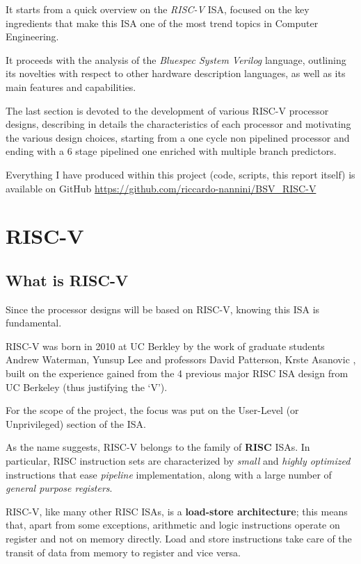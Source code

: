 \documentclass[12pt,oneside,a4paper]{article}
\begin{document}
It starts from a quick overview on the \textit{RISC-V} ISA, focused on the key ingredients that make this ISA one of the most trend topics in Computer Engineering.

It proceeds with the analysis of the \textit{Bluespec System Verilog} language, outlining its novelties with respect to other hardware description languages, as well as its main features and capabilities. 

The last section is devoted to the development of various RISC-V processor designs, describing in details the characteristics of each processor and motivating the various design choices, starting from a one cycle non pipelined processor and ending with a 6 stage pipelined one enriched with multiple branch predictors.

Everything I have produced within this project (code, scripts, this report itself) is available on GitHub \url{https://github.com/riccardo-nannini/BSV_RISC-V}


\section{RISC-V} \label{sec:risc-v}
\subsection{What is RISC-V}
Since the processor designs will be based on RISC-V, knowing this ISA is fundamental.

RISC-V was born in 2010 at UC Berkley by the work of graduate students Andrew Waterman, Yunsup Lee and professors David Patterson, Krste Asanovic \cite{risc-v_original}, built on the experience gained from the 4 previous major RISC ISA design from UC Berkeley (thus justifying the ‘V’).

For the scope of the project, the focus was put on the User-Level (or Unprivileged) section of the ISA.

As the name suggests, RISC-V belongs to the family of \textbf{RISC} ISAs. In particular, RISC instruction sets are characterized by \textit{small} and \textit{highly optimized} instructions that ease \textit{pipeline} implementation, along with a large number of \textit{general purpose registers}. 

RISC-V, like many other RISC ISAs, is a \textbf{load-store architecture}; this means that, apart from some exceptions, arithmetic and logic instructions operate on register and not on memory directly. Load and store instructions take care of the transit of data from memory to register and vice versa.
\end{document}

